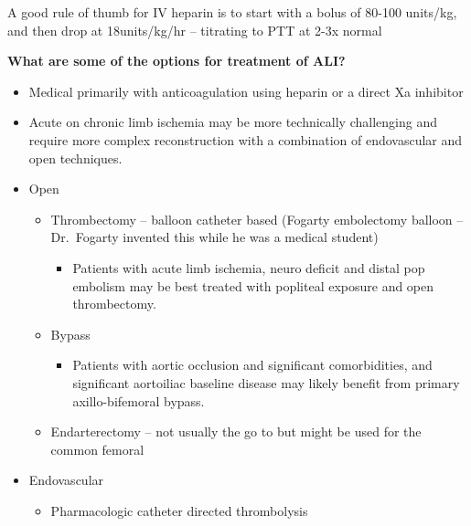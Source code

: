 \documentclass[
]{book}
\providecommand{\tightlist}{%
  \setlength{\itemsep}{0pt}\setlength{\parskip}{0pt}}
\begin{document}
A good rule of thumb for IV heparin is to start with a bolus of 80-100
units/kg, and then drop at 18units/kg/hr -- titrating to PTT at 2-3x
normal

\textbf{What are some of the options for treatment of ALI?}

\begin{itemize}
\item
  Medical primarily with anticoagulation using heparin or a direct Xa
  inhibitor
\item
  Acute on chronic limb ischemia may be more technically challenging
  and require more complex reconstruction with a combination of
  endovascular and open techniques. \citep{dedonatoAcuteChronicLimb2018, creagerClinicalPracticeAcute2012}
\item
  Open

  \begin{itemize}
  \item
    Thrombectomy -- balloon catheter based (Fogarty embolectomy
    balloon -- Dr.~Fogarty invented this while he was a medical
    student)

    \begin{itemize}
    \tightlist
    \item
      Patients with acute limb ischemia, neuro deficit and distal
      pop embolism may be best treated with popliteal exposure and
      open thrombectomy. \citep{darwoodSurgeryThrombolysisInitial2018, kempeResultsSurgicalManagement2014}
    \end{itemize}
  \item
    Bypass

    \begin{itemize}
    \tightlist
    \item
      Patients with aortic occlusion and significant
      comorbidities, and significant aortoiliac baseline disease
      may likely benefit from primary axillo-bifemoral bypass.
      \citep{mohapatraRiskFactorsPerioperative2018}
    \end{itemize}
  \item
    Endarterectomy -- not usually the go to but might be used for
    the common femoral~
  \end{itemize}
\item
  Endovascular~

  \begin{itemize}
  \item
    Pharmacologic catheter directed thrombolysis


\end{itemize}
\end{itemize}
\end{document}
